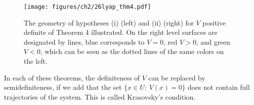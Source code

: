 \begin{figure}[h!]
	\centering
	\texttt{[image: figures/ch2/26lyap\_thm4.pdf]}
	\caption{The geometry of hypotheses (i) (left) and (ii) (right) for $\dot{V}$ positive definite of Theorem 4 illustrated. On the right level surfaces are designated by lines, blue corresponds to $V=0$, red $V>0$, and green $V<0$, which can be seen as the dotted lines of the same colors on the left.}
	\label{fig:lyap_thm4_hypos}
\end{figure}

\begin{remark}[]
	In each of these theorems, the definiteness of $ \dot{V}$ can be replaced by semidefiniteness, if we add that the set $\{x\in U:\ \dot{V}(x)=0 \}$ does not contain full trajectories of the system. This is called Krasovsky's condition.
\end{remark}

